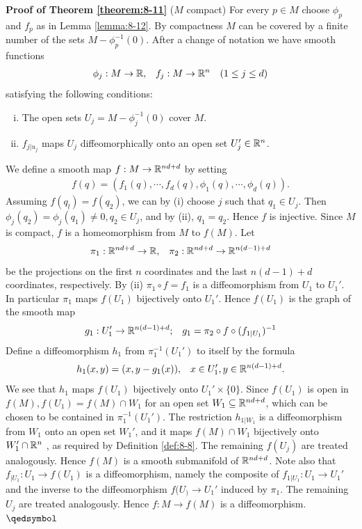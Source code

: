 \noindent\textbf{Proof of Theorem \ref{theorem:8-11}} ($M$ compact)%
For every $p\in M$ choose $\phi_p$ and $f_p$ as in
Lemma \ref{lemma:8-12}. By compactness $M$ can be covered by a finite number of the sets
$M - \phi_p^{-1}(0)$. After a change of notation we have smooth functions
\begin{align*}
  \phi_j: M\to\mathbb{R}, && f_j:M\to \mathbb{R}^n && (1\le j\le d)
\end{align*}
satisfying the following conditions:
\begin{enumerate}[(i)]
  \item The open sets $U_j = M - \phi_j^{-1}(0)$ cover $M$.
  \item $f_{j|u_j}$ maps $U_j$ diffeomorphically onto an open set $U_j'\in\mathbb{R}^n$.
\end{enumerate}
We define a smooth map $f:M\to \mathbb{R}^{nd+d}$ by setting 
\begin{align*}
  f(q) = (f_1(q), \cdots, f_d(q), \phi_1(q), \cdots, \phi_d(q) ).
\end{align*}
Assuming $f(q_l) = f(q_2)$, we can by (i) choose $j$ such that $q_1\in U_j$. Then
$\phi_j(q_2)=\phi_j(q_1)\neq 0, q_2\in U_j$, and by (ii), $q_1=q_2$. Hence $f$ is injective. 
Since $M$ is compact, $f$ is a homeomorphism from $M$ to $f(M).$ Let
\begin{align*}
  \pi_1:\mathbb{R}^{nd+d}\to\mathbb{R}, && \pi_2:\mathbb{R}^{nd+d}\to\mathbb{R}^{n(d-1) + d}
\end{align*}
be the projections on the first $n$ coordinates and the last $n(d - 1) + d$ coordinates,
respectively. By (ii) $\pi_1\circ f = f_1$ is a diffeomorphism from $U_1$ to $U_1'$. In particular
$\pi_1$ maps $f(U_1)$ bijectively onto $U_1'$. Hence $f(U_1)$ is the graph of the smooth map
\begin{align*}
  g_1:U_1'\to\mathbb{R}^{n(d-1)+d}; && 
  g_1 = \pi_2\circ f\circ (f_{1|U_1})^{-1}
\end{align*}
Define a diffeomorphism $h_1$ from $\pi_1^{-1}(U_1')$ to itself by the formula 
\begin{align*}
  h_1(x, y) = (x, y-g_1(x)), && x\in U_1', y\in \mathbb{R}^{n(d-1)+d}.
\end{align*}
We see that $h_1$ maps $f(U_1)$ bijectively onto $U_1'\times\{0\}$. Since $f(U_1)$ is open in
$f(M), f(U_1) = f(M)\cap W_1$ for an open set $W_1\subseteq \mathbb{R}^{nd+d}$, which can be chosen
to be contained in $\pi_1^{-1}(U_1')$. The restriction $h_{1|W_1}$ is a diffeomorphism from $W_1$
onto an open set $W_1'$, and it maps $f(M)\cap W_1$ bijectively onto $W_1'\cap \mathbb{R}^n$ , as
required by Definition \ref{def:8-8}. The remaining $f(U_j)$ are treated analogously. Hence
$f(M)$ is a smooth submanifold of $\mathbb{R}^{nd+d}$. Note also that $f_{|U_1}:U_1\to f(U_1)$ is
a diffeomorphism, namely the composite of $f_{1|U_1}:U_1\to U_1'$ and the inverse to
the diffeomorphism $f(U_)\to U_1'$ induced by $\pi_1$. The remaining $U_j$ are treated
analogously. Hence $f: M\to f(M)$ is a diffeomorphism. \hfill\(\qedsymbol\)

